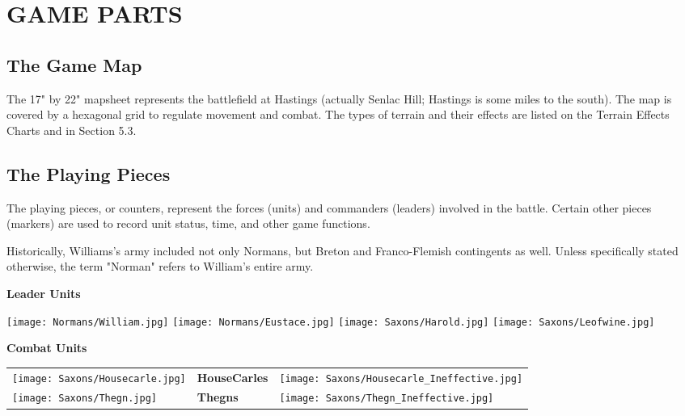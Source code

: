 \section{GAME PARTS}

\subsection{The Game Map}

The 17" by 22" mapsheet represents the battlefield at Hastings (actually Senlac Hill; Hastings is some miles to the south). The map is covered by a hexagonal grid to regulate movement and combat. The types of terrain and their effects are listed on the Terrain Effects Charts and in Section 5.3.

\subsection{The Playing Pieces}

The playing pieces, or counters, represent the forces (units) and commanders (leaders) involved in the battle. Certain other pieces (markers) are used to record unit status, time, and other game functions.

Historically, Williams's army included not only Normans, but Breton and Franco-Flemish contingents as well. Unless specifically stated otherwise, the term "Norman" refers to William's entire army.

\begin{center}
\textbf{Leader Units}
\end{center}
\par
\hspace{1em}
\texttt{[image: Normans/William.jpg]}
\hspace{1em}
\texttt{[image: Normans/Eustace.jpg]}
\hspace{1em}
\texttt{[image: Saxons/Harold.jpg]}
\hspace{1em}
\texttt{[image: Saxons/Leofwine.jpg]}

\par
\begin{center}
  \textbf{Combat Units}
  \break
\end{center}

\renewcommand\tabularxcolumn[1]{m{#1}}
\begin{tabularx}{0.5\textwidth}{
    >{\raggedright\arraybackslash}X
    >{\centering\arraybackslash}X
    >{\raggedleft\arraybackslash}X}

  \texttt{[image: Saxons/Housecarle.jpg]} & \textbf{HouseCarles} & \texttt{[image: Saxons/Housecarle\_Ineffective.jpg]} \\
  \texttt{[image: Saxons/Thegn.jpg]} & \textbf{Thegns} & \texttt{[image: Saxons/Thegn\_Ineffective.jpg]}
\end{tabularx}

